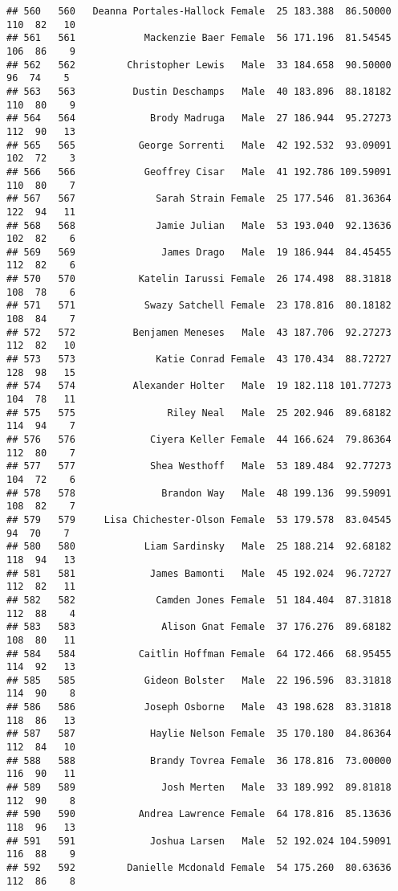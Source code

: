 \documentclass[
]{article}
\begin{document}
\begin{verbatim}
## 560   560   Deanna Portales-Hallock Female  25 183.388  86.50000 110  82   10
## 561   561            Mackenzie Baer Female  56 171.196  81.54545 106  86    9
## 562   562         Christopher Lewis   Male  33 184.658  90.50000  96  74    5
## 563   563          Dustin Deschamps   Male  40 183.896  88.18182 110  80    9
## 564   564             Brody Madruga   Male  27 186.944  95.27273 112  90   13
## 565   565           George Sorrenti   Male  42 192.532  93.09091 102  72    3
## 566   566            Geoffrey Cisar   Male  41 192.786 109.59091 110  80    7
## 567   567              Sarah Strain Female  25 177.546  81.36364 122  94   11
## 568   568              Jamie Julian   Male  53 193.040  92.13636 102  82    6
## 569   569               James Drago   Male  19 186.944  84.45455 112  82    6
## 570   570           Katelin Iarussi Female  26 174.498  88.31818 108  78    6
## 571   571            Swazy Satchell Female  23 178.816  80.18182 108  84    7
## 572   572          Benjamen Meneses   Male  43 187.706  92.27273 112  82   10
## 573   573              Katie Conrad Female  43 170.434  88.72727 128  98   15
## 574   574          Alexander Holter   Male  19 182.118 101.77273 104  78   11
## 575   575                Riley Neal   Male  25 202.946  89.68182 114  94    7
## 576   576             Ciyera Keller Female  44 166.624  79.86364 112  80    7
## 577   577             Shea Westhoff   Male  53 189.484  92.77273 104  72    6
## 578   578               Brandon Way   Male  48 199.136  99.59091 108  82    7
## 579   579     Lisa Chichester-Olson Female  53 179.578  83.04545  94  70    7
## 580   580            Liam Sardinsky   Male  25 188.214  92.68182 118  94   13
## 581   581             James Bamonti   Male  45 192.024  96.72727 112  82   11
## 582   582              Camden Jones Female  51 184.404  87.31818 112  88    4
## 583   583               Alison Gnat Female  37 176.276  89.68182 108  80   11
## 584   584           Caitlin Hoffman Female  64 172.466  68.95455 114  92   13
## 585   585            Gideon Bolster   Male  22 196.596  83.31818 114  90    8
## 586   586            Joseph Osborne   Male  43 198.628  83.31818 118  86   13
## 587   587             Haylie Nelson Female  35 170.180  84.86364 112  84   10
## 588   588             Brandy Tovrea Female  36 178.816  73.00000 116  90   11
## 589   589               Josh Merten   Male  33 189.992  89.81818 112  90    8
## 590   590           Andrea Lawrence Female  64 178.816  85.13636 118  96   13
## 591   591             Joshua Larsen   Male  52 192.024 104.59091 116  88    9
## 592   592         Danielle Mcdonald Female  54 175.260  80.63636 112  86    8

\end{verbatim}
\end{document}
